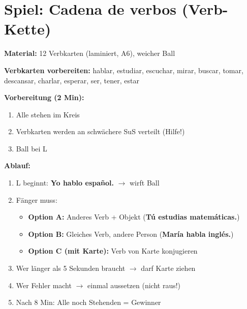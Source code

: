 \documentclass[11pt,a4paper]{article}
\newcommand{\es}[1]{\textbf{#1}}
\begin{document}
\section*{Spiel: Cadena de verbos (Verb-Kette)}

\begin{tcolorbox}[colback=white, colframe=spiel, title=\textcolor{white}{\textbf{Spielablauf (10 Min.)}}]

\textbf{Material:} 12 Verbkarten (laminiert, A6), weicher Ball

\vspace{0.3cm}

\textbf{Verbkarten vorbereiten:}
hablar, estudiar, escuchar, mirar, buscar, tomar, descansar, charlar, esperar, ser, tener, estar

\vspace{0.3cm}

\textbf{Vorbereitung (2 Min):}
\begin{enumerate}[nosep]
    \item Alle stehen im Kreis
    \item Verbkarten werden an schwächere SuS verteilt (Hilfe!)
    \item Ball bei L
\end{enumerate}

\vspace{0.3cm}

\textbf{Ablauf:}
\begin{enumerate}[nosep]
    \item L beginnt: \es{Yo hablo español.} $\rightarrow$ wirft Ball
    \item Fänger muss:
    \begin{itemize}[nosep]
        \item \textbf{Option A:} Anderes Verb + Objekt (\es{Tú estudias matemáticas.})
        \item \textbf{Option B:} Gleiches Verb, andere Person (\es{María habla inglés.})
        \item \textbf{Option C (mit Karte):} Verb von Karte konjugieren
    \end{itemize}
    \item Wer länger als 5 Sekunden braucht $\rightarrow$ darf Karte ziehen
    \item Wer Fehler macht $\rightarrow$ einmal aussetzen (nicht raus!)
    \item Nach 8 Min: Alle noch Stehenden = Gewinner
\end{enumerate}

\vspace{0.3cm}


\end{tcolorbox}
\end{document}

